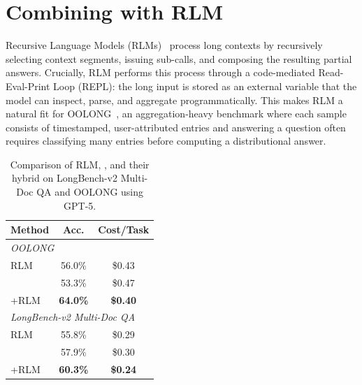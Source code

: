 \section{Combining \toolName{} with RLM}\label{sec:with_rlm}
Recursive Language Models (RLMs)~\citep{zhang2025recursive} process long contexts by recursively selecting context segments, issuing sub-calls, and composing the resulting partial answers. Crucially, RLM performs this process through a code-mediated Read-Eval-Print Loop (REPL): the long input is stored as an external variable that the model can inspect, parse, and aggregate programmatically. This makes RLM a natural fit for OOLONG~\citep{bertsch2025oolong}, an aggregation-heavy benchmark where each sample consists of timestamped, user-attributed entries and answering a question often requires classifying many entries before computing a distributional answer.

\begin{table}
\centering
\begin{tabular}{lcc}
\toprule
\textbf{Method} & \textbf{Acc.} & \textbf{Cost/Task} \\
\midrule
\multicolumn{3}{l}{\textit{OOLONG}} \\
RLM & 56.0\% & \$0.43 \\
\toolName{} & 53.3\% & \$0.47 \\
\toolName{}+RLM & \textbf{64.0\%} & \textbf{\$0.40} \\
\midrule
\multicolumn{3}{l}{\textit{LongBench-v2 Multi-Doc QA}} \\
RLM & 55.8\% & \$0.29 \\
\toolName{} & 57.9\% & \$0.30 \\
\toolName{}+RLM & \textbf{60.3\%} & \textbf{\$0.24} \\
\bottomrule
\end{tabular}
\caption{Comparison of RLM, \toolName{}, and their hybrid on LongBench-v2 Multi-Doc QA and OOLONG using GPT-5.}
\label{tab:oolong}
\end{table}

